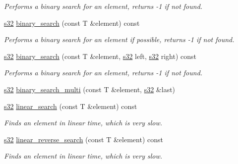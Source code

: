 \begin{DoxyCompactItemize}
\begin{DoxyCompactList}\small\item\em Performs a binary search for an element, returns -\/1 if not found. \end{DoxyCompactList}\item 
\hyperlink{namespaceirr_ac66849b7a6ed16e30ebede579f9b47c6}{s32} \hyperlink{classirr_1_1core_1_1pseudoarray_abe9db8ae9f0aa06d9bdfa36addc45102}{binary\+\_\+search} (const T \&element) const 
\begin{DoxyCompactList}\small\item\em Performs a binary search for an element if possible, returns -\/1 if not found. \end{DoxyCompactList}\item 
\hyperlink{namespaceirr_ac66849b7a6ed16e30ebede579f9b47c6}{s32} \hyperlink{classirr_1_1core_1_1pseudoarray_a06fa9de8befb5ce24e6e3c86692fdf72}{binary\+\_\+search} (const T \&element, \hyperlink{namespaceirr_ac66849b7a6ed16e30ebede579f9b47c6}{s32} left, \hyperlink{namespaceirr_ac66849b7a6ed16e30ebede579f9b47c6}{s32} right) const 
\begin{DoxyCompactList}\small\item\em Performs a binary search for an element, returns -\/1 if not found. \end{DoxyCompactList}\item 
\hyperlink{namespaceirr_ac66849b7a6ed16e30ebede579f9b47c6}{s32} \hyperlink{classirr_1_1core_1_1pseudoarray_a5c0fc3ea4723e044e48b1479513a9014}{binary\+\_\+search\+\_\+multi} (const T \&element, \hyperlink{namespaceirr_ac66849b7a6ed16e30ebede579f9b47c6}{s32} \&last)
\item 
\hyperlink{namespaceirr_ac66849b7a6ed16e30ebede579f9b47c6}{s32} \hyperlink{classirr_1_1core_1_1pseudoarray_a3ad731721c59cc25dfaf9619c5acb087}{linear\+\_\+search} (const T \&element) const 
\begin{DoxyCompactList}\small\item\em Finds an element in linear time, which is very slow. \end{DoxyCompactList}\item 
\hyperlink{namespaceirr_ac66849b7a6ed16e30ebede579f9b47c6}{s32} \hyperlink{classirr_1_1core_1_1pseudoarray_a04c85c2d9932d53c0c9efbeae53e1d59}{linear\+\_\+reverse\+\_\+search} (const T \&element) const 
\begin{DoxyCompactList}\small\item\em Finds an element in linear time, which is very slow. \end{DoxyCompactList}\item 

\end{DoxyCompactItemize}
